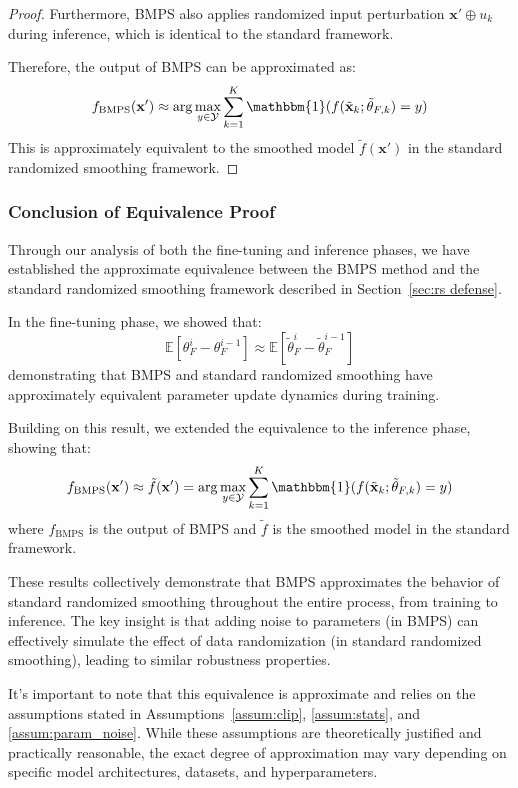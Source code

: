 \begin{proof}
Furthermore, BMPS also applies randomized input perturbation $\mathbf{x}' \oplus u_k$ during inference, which is identical to the standard framework.

Therefore, the output of BMPS can be approximated as:
\begin{equation}
    f_{\text{BMPS}}(\mathbf{x}') \approx \arg\max_{y \in \mathcal{Y}} \sum_{k=1}^K \mathbbm{1}(f(\tilde{\mathbf{x}}_k; \tilde{\theta}_{F,k}) = y)
\end{equation}
This is approximately equivalent to the smoothed model $\tilde{f}(\mathbf{x}')$ in the standard randomized smoothing framework.
\end{proof}

\subsubsection{Conclusion of Equivalence Proof}
Through our analysis of both the fine-tuning and inference phases, we have established the approximate equivalence between the BMPS method and the standard randomized smoothing framework described in Section~\ref{sec:rs defense}. 

In the fine-tuning phase, we showed that:
\begin{equation}
    \mathbb{E}[\theta^i_F - \theta^{i-1}_F] \approx \mathbb{E}[\tilde{\theta}^i_F - \tilde{\theta}^{i-1}_F]
\end{equation}
demonstrating that BMPS and standard randomized smoothing have approximately equivalent parameter update dynamics during training.

Building on this result, we extended the equivalence to the inference phase, showing that:
\begin{equation}
    f_{\text{BMPS}}(\mathbf{x}') \approx \tilde{f}(\mathbf{x}') = \arg\max_{y \in \mathcal{Y}} \sum_{k=1}^K \mathbbm{1}(f(\tilde{\mathbf{x}}_k; \tilde{\theta}_{F,k}) = y)
\end{equation}
where $f_{\text{BMPS}}$ is the output of BMPS and $\tilde{f}$ is the smoothed model in the standard framework.

These results collectively demonstrate that BMPS approximates the behavior of standard randomized smoothing throughout the entire process, from training to inference. The key insight is that adding noise to parameters (in BMPS) can effectively simulate the effect of data randomization (in standard randomized smoothing), leading to similar robustness properties.

It's important to note that this equivalence is approximate and relies on the assumptions stated in Assumptions~\ref{assum:clip}, \ref{assum:stats}, and \ref{assum:param_noise}. While these assumptions are theoretically justified and practically reasonable, the exact degree of approximation may vary depending on specific model architectures, datasets, and hyperparameters.

